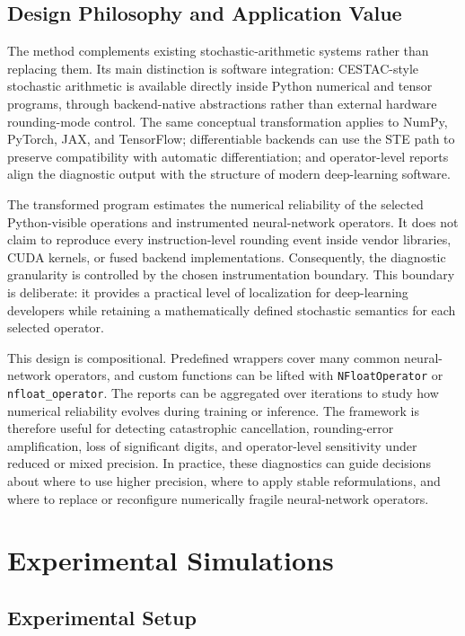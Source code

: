 \documentclass[manuscript, screen]{acmart}
\begin{document}
\subsection{Design Philosophy and Application Value}

The method complements existing stochastic-arithmetic systems rather than replacing them. Its main distinction is software integration: CESTAC-style stochastic arithmetic is available directly inside Python numerical and tensor programs, through backend-native abstractions rather than external hardware rounding-mode control. The same conceptual transformation applies to NumPy, PyTorch, JAX, and TensorFlow; differentiable backends can use the STE path to preserve compatibility with automatic differentiation; and operator-level reports align the diagnostic output with the structure of modern deep-learning software.

The transformed program estimates the numerical reliability of the selected Python-visible operations and instrumented neural-network operators. It does not claim to reproduce every instruction-level rounding event inside vendor libraries, CUDA kernels, or fused backend implementations. Consequently, the diagnostic granularity is controlled by the chosen instrumentation boundary. This boundary is deliberate: it provides a practical level of localization for deep-learning developers while retaining a mathematically defined stochastic semantics for each selected operator.

This design is compositional. Predefined wrappers cover many common neural-network operators, and custom functions can be lifted with \texttt{NFloatOperator} or \texttt{nfloat\_operator}. The reports can be aggregated over iterations to study how numerical reliability evolves during training or inference. The framework is therefore useful for detecting catastrophic cancellation, rounding-error amplification, loss of significant digits, and operator-level sensitivity under reduced or mixed precision. In practice, these diagnostics can guide decisions about where to use higher precision, where to apply stable reformulations, and where to replace or reconfigure numerically fragile neural-network operators.


\section{Experimental Simulations}\label{sec:experiments}
\subsection{Experimental Setup}
\end{document}
